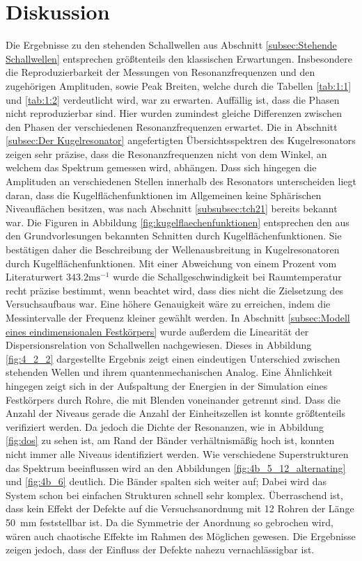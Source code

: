 \section{Diskussion}
\label{sec:Diskussion}
Die Ergebnisse zu den stehenden Schallwellen aus Abschnitt \ref{subsec:Stehende Schallwellen} entsprechen größtenteils den klassischen Erwartungen. 
Insbesondere die Reproduzierbarkeit der Messungen von Resonanzfrequenzen und den zugehörigen Amplituden, sowie Peak Breiten, welche durch die Tabellen \ref{tab:1:1} und \ref{tab:1:2} verdeutlicht wird, war zu erwarten.
Auffällig ist, dass die Phasen nicht reproduzierbar sind. 
Hier wurden zumindest gleiche Differenzen zwischen den Phasen der verschiedenen Resonanzfrequenzen erwartet.
Die in Abschnitt \ref{subsec:Der Kugelresonator} angefertigten Übersichtsspektren des Kugelresonators zeigen sehr präzise, dass die Resonanzfrequenzen nicht von dem Winkel, an welchem das Spektrum gemessen wird, abhängen.
Dass sich hingegen die Amplituden an verschiedenen Stellen innerhalb des Resonators unterscheiden liegt daran, dass die Kugelflächenfunktionen im Allgemeinen keine Sphärischen Niveauflächen besitzen, was nach Abschnitt \ref{subsubsec:tch21} bereits bekannt war.
Die Figuren in Abbildung \ref{fig:kugelflaechenfunktionen} entsprechen den aus den Grundvorlesungen bekannten Schnitten durch Kugelflächenfunktionen.
Sie bestätigen daher die Beschreibung der Wellenausbreitung in Kugelresonatoren durch Kugelflächenfunktionen.
Mit einer Abweichung von einem Prozent vom Literaturwert $343.2\text{ms}^{-1}$ \cite{giancoli} wurde die Schallgeschwindigkeit bei Raumtemperatur recht präzise bestimmt, wenn beachtet wird, dass dies nicht die Zielsetzung des Versuchsaufbaus war. 
Eine höhere Genauigkeit wäre zu erreichen, indem die Messintervalle der Frequenz kleiner gewählt werden. 
In Abschnitt \ref{subsec:Modell eines eindimensionalen Festkörpers} wurde außerdem die Linearität der Dispersionsrelation von Schallwellen nachgewiesen.
Dieses in Abbildung \ref{fig:4_2_2} dargestellte Ergebnis zeigt einen eindeutigen Unterschied zwischen stehenden Wellen und ihrem quantenmechanischen Analog.
Eine Ähnlichkeit hingegen zeigt sich in der Aufspaltung der Energien in der Simulation eines Festkörpers durch Rohre, die mit Blenden voneinander getrennt sind.
Dass die Anzahl der Niveaus gerade die Anzahl der Einheitszellen ist konnte größtenteils verifiziert werden. 
Da jedoch die Dichte der Resonanzen, wie in Abbildung \ref{fig:dos} zu sehen ist, am Rand der Bänder verhältnismäßig hoch ist, konnten nicht immer alle Niveaus identifiziert werden.
Wie verschiedene Superstrukturen das Spektrum beeinflussen wird an den Abbildungen \ref{fig:4b_5_12_alternating} und \ref{fig:4b_6} deutlich. 
Die Bänder spalten sich weiter auf; Dabei wird das System schon bei einfachen Strukturen schnell sehr komplex.
Überraschend ist, dass kein Effekt der Defekte auf die Versuchsanordnung mit 12 Rohren der Länge 50~mm feststellbar ist.
Da die Symmetrie der Anordnung so gebrochen wird, wären auch chaotische Effekte im Rahmen des Möglichen gewesen.
Die Ergebnisse zeigen jedoch, dass der Einfluss der Defekte nahezu vernachlässigbar ist.
